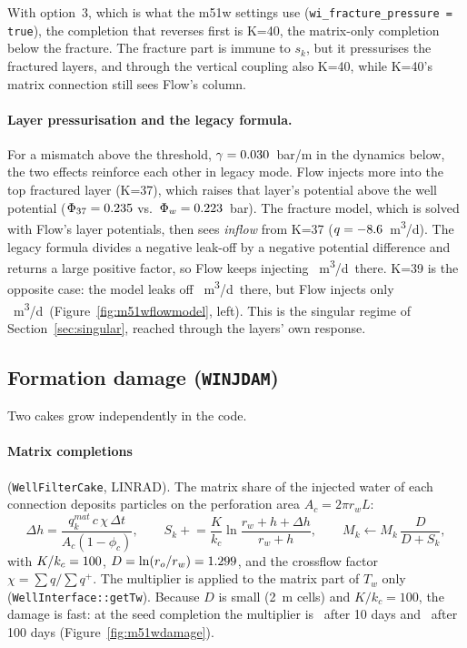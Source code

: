 \documentclass[11pt,a4paper]{article}
\newcommand{\Phiw}{\Phi_w}
\newcommand{\rated}{\si{m^3/d}}
\begin{document}
With option~3, which is what the m51w settings use (\texttt{wi\_fracture\_pressure = true}),
the completion that reverses first is K=40, the matrix-only completion below the fracture.
The fracture part is immune to $s_k$, but it pressurises the fractured layers, and through the
vertical coupling also K=40, while K=40's matrix connection still sees Flow's column.

\paragraph{Layer pressurisation and the legacy formula.}  For a mismatch above the threshold,
$\gamma=0.030$~bar/m in the dynamics below, the two effects reinforce each other in legacy
mode.  Flow injects more into the top fractured layer (K=37), which raises that layer's
potential above the well potential ($\Phi_{37}=0.235$ vs.\ $\Phiw=\WLegNphiw$~bar).  The
fracture model, which is solved with Flow's layer potentials, then sees \emph{inflow} from K=37
($q=-8.6$~\rated).  The legacy formula divides a negative leak-off by a negative
potential difference and returns a large positive factor, so Flow keeps injecting
\WLegNqfTop~\rated\ there.  K=39 is the opposite case: the model leaks off \WLegNqmodLow~\rated\
there, but Flow injects only \WLegNqfLow~\rated\ (Figure~\ref{fig:m51wflowmodel}, left).  This
is the singular regime of Section~\ref{sec:singular}, reached through the layers' own response.

\subsection{Formation damage (\texttt{WINJDAM})}

Two cakes grow independently in the code.

\paragraph{Matrix completions} (\texttt{WellFilterCake}, LINRAD).  The matrix share of the
injected water of each connection deposits particles on the perforation area
$A_c=2\pi r_wL$:
\begin{equation}
  \Delta h=\frac{q^{mat}_k\,c\,\chi\,\Delta t}{A_c(1-\phi_c)},\qquad
  S_k\mathrel{+}=\frac{K}{k_c}\ln\frac{r_w+h+\Delta h}{r_w+h},\qquad
  M_k\leftarrow M_k\,\frac{D}{D+S_k},
\end{equation}
with $K/k_c=100$, $D=\ln(r_o/r_w)=1.299$, and the crossflow factor
$\chi=\sum q/\sum q^+$.  The multiplier is applied to the matrix part of $T_w$ only
(\texttt{WellInterface::getTw}).  Because $D$ is small (2~m cells) and $K/k_c=100$, the damage
is fast: at the seed completion the multiplier is \WmTen\ after 10 days and \WmHundred\ after 100
days (Figure~\ref{fig:m51wdamage}).
\end{document}
